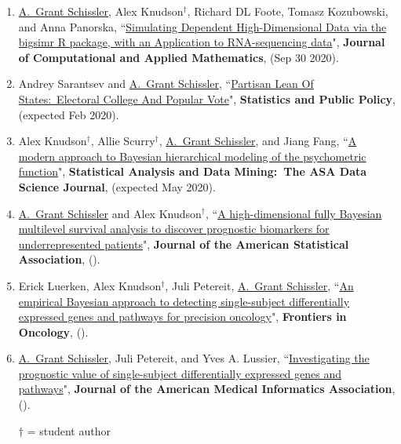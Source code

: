 \documentclass[paper=a4,fontsize=11pt]{scrartcl} %
\newcommand{\PaperEntry}[7]{
		\noindent #1, ``\href{#7}{#2}", \textit{#3} \textbf{#4}, #5 (#6).}
\begin{document}
\begin{enumerate}
  
\item \PaperEntry{\underline{A.~Grant Schissler}, Alex Knudson$^{\dagger}$, Richard DL Foote, Tomasz Kozubowski, and Anna Panorska}{Simulating Dependent High-Dimensional Data via the bigsimr R package, with an Application to RNA-sequencing data}{}{Journal of Computational and Applied Mathematics}{}{Sep 30 2020}{}

\item \PaperEntry{Andrey Sarantsev and \underline{A.~Grant Schissler}}{Partisan Lean Of States:~Electoral College And Popular Vote}{}{Statistics and Public Policy}{}{expected Feb 2020}{}
  
\item \PaperEntry{Alex Knudson$^{\dagger}$, Allie Scurry$^{\dagger}$, \underline{A.~Grant Schissler}, and Jiang Fang}{A modern approach to Bayesian hierarchical modeling of the psychometric function}{}{Statistical Analysis and Data Mining:~The ASA Data Science Journal}{}{expected May 2020}{}

\item \PaperEntry{\underline{A.~Grant Schissler} and Alex Knudson$^{\dagger}$}{A high-dimensional fully Bayesian multilevel survival analysis to discover prognostic biomarkers for underrepresented patients}{}{Journal of the American Statistical Association}{}{}{}

\item \PaperEntry{Erick Luerken, Alex Knudson$^{\dagger}$, Juli Petereit, \underline{A.~Grant Schissler}}{An empirical Bayesian approach to detecting single-subject differentially expressed genes and pathways for precision oncology}{}{Frontiers in Oncology}{}{}{}

  \item \PaperEntry{\underline{A.~Grant Schissler}, Juli Petereit, and Yves A. Lussier}{Investigating the prognostic value of single-subject differentially expressed genes and pathways}{}{Journal of the American Medical Informatics Association}{}{}{}


  $\dagger$ = student author
  
\end{enumerate}

\end{document}
